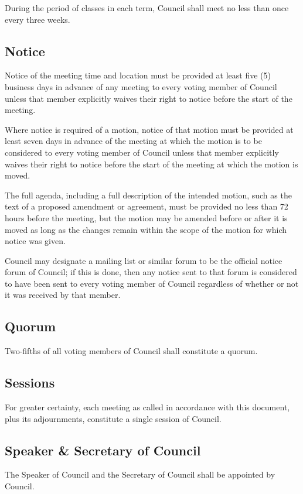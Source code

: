 During the period of classes in each term, Council shall meet no less
than once every three weeks.

\subsection{Notice}
Notice of the meeting time and location must be provided at least five (5) business 
days in advance of any meeting to every voting member of Council unless that 
member explicitly waives their right to notice before the start of the meeting.

Where notice is required of a motion, notice of that motion must be provided at
least seven days in advance of the meeting at which the motion is to be
considered to every voting member of Council unless that member
explicitly waives their right to notice before the start of the meeting at
which the motion is moved. 

The full agenda, including a full description of the intended motion, such as
the text of a proposed amendment or agreement, must be provided no less than 
72 hours before the meeting, but the motion may be amended before or after 
it is moved as long as the changes remain within the scope of the motion 
for which notice was given.

Council may designate a mailing list or similar forum to be the
official notice forum of Council; if this is done, then any notice
sent to that forum is considered to have been sent to every voting member of
Council regardless of whether or not it was received by that member.

\subsection{Quorum}
Two-fifths of all voting members of Council shall constitute a
quorum.

\subsection{Sessions}
For greater certainty, each meeting as called in accordance with this document,
plus its adjournments, constitute a single session of Council.

\subsection{Speaker \& Secretary of Council}
The Speaker of Council and the Secretary of Council shall
be appointed by Council. 

